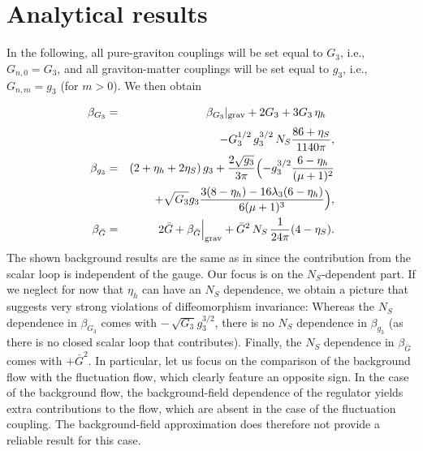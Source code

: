\documentclass[11pt]{book} %
\newcommand{\bea}{\begin{eqnarray}}
\newcommand{\eea}{\end{eqnarray}}
\begin{document}
\section{Analytical results}
In the following, all pure-graviton couplings will be set equal to $G_3$, i.e., $G_{n,0}= G_3$, and
all graviton-matter couplings will be set equal to $g_3$, i.e., $G_{n,m}=g_3$ (for $m>0$).
We then obtain
%
\bea
\beta_{G_3}&=& \beta_{G_3}|_{\rm grav} + 2 G_3 + 3G_3\, \eta_h \phantom{\frac{1}{1}}\nonumber\\
&{}& - G_3^{1/2} \,g_3^{3/2}\, N_S\frac{86+\eta_S}{1140 \pi}, \label{eq:betaG3}\\
%
\beta_{g_3}&=& \left(2 +\eta_h+ 2\eta_S\right)g_3  +  \frac{2\sqrt{g_3}}{3\pi} \Bigl(-g_3^{3/2} \frac{6-\eta_h}{(\mu+1)^2} \nonumber\\
&{}&+ \sqrt{G_3}g_3 \frac{3(8-\eta_h)-16\lambda_3(6-\eta_h)}{6(\mu+1)^3} \Bigr)\label{eq:betag3},\\
%
\beta_{\bar{G}}&=& 2 \bar{G}+ \beta_{\bar{G}}\Big|_{\rm grav} %
+ \bar{G}^2\, N_S\, \frac{1}{24\pi}(4-\eta_S).
\eea
%
The shown background results are the same as in \cite{Dona:2013qba} since the contribution from the scalar loop is independent of the gauge.
Our focus is on the $N_S$-dependent part.
If we neglect for now that $\eta_h$ can have an $N_S$ dependence, we obtain a picture that suggests very strong violations of diffeomorphism invariance:
Whereas the $N_S$ dependence in $\beta_{G_3}$ comes with $-\,\sqrt{G_3}g_3^{3/2}$, there is no $N_S$ dependence in $\beta_{g_3}$ (as there is no closed scalar loop that contributes).
Finally, the $N_S$ dependence in $\beta_{\bar{G}}$ comes with $+ \bar{G}^2$.
In particular, let us focus on the comparison of the background flow with the fluctuation flow, which clearly feature an opposite sign.
In the case of the background flow, the background-field dependence of the regulator yields extra contributions to the flow, which are absent in the case of the fluctuation coupling.
The background-field approximation does therefore not provide a reliable result for this case.
\end{document}
